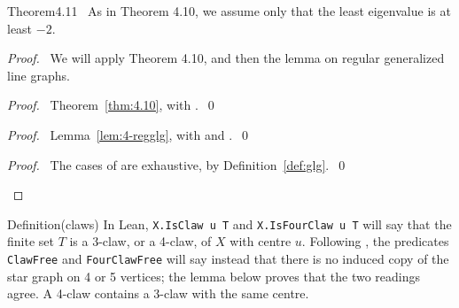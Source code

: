 \begin{cgss}{Theorem}{4.11}\label{thm:4.11}
 \new\ As in Theorem 4.10, we assume only that the least eigenvalue is at least $-2$.
\end{cgss}
\begin{proof}
 \pfsketch\ We will apply Theorem 4.10, and then the lemma on regular generalized line graphs.
 \begin{proof}\pf\ Theorem~\ref{thm:4.10}, with .~\qed\end{proof}
 \begin{proof}\pf\ Lemma~\ref{lem:4-regglg}, with  and .~\qed\end{proof}
 \qedstep
 \begin{proof}\pf\ The cases of  are exhaustive, by
  Definition~\ref{def:glg}.~\qed\end{proof}
\end{proof}

\begin{namedresult}{Definition}{(claws)}\label{def:claw}
 \uses{}
 In Lean, \texttt{X.IsClaw u T} and \texttt{X.IsFourClaw u T} will say that the finite set $T$ is
 a 3-claw, or a 4-claw, of $X$ with centre $u$. Following , the
 predicates \texttt{ClawFree} and \texttt{FourClawFree} will say instead that there is no induced
 copy of the star graph  on 4 or 5 vertices; the lemma below proves
 that the two readings agree. A 4-claw contains a 3-claw with the same centre.
\end{namedresult}

